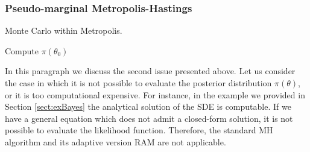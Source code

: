 \subsubsection{Pseudo-marginal Metropolis-Hastings}
\begin{algorithm}[t]
	\caption{Monte Carlo within Metropolis.}
	\label{alg:MCWM}
	Compute $\pi(\theta_0)$ \;
\end{algorithm}
In this paragraph we discuss the second issue presented above. Let us consider the case in which it is not possible to evaluate the posterior distribution $\pi(\theta)$, or it is too computational expensive. For instance, in the example we provided in Section \ref{sect:exBayes} the analytical solution of the SDE is computable. If we have a general equation which does not admit a closed-form solution, it is not possible to evaluate the likelihood function. Therefore, the standard MH algorithm and its adaptive version RAM are not applicable.

